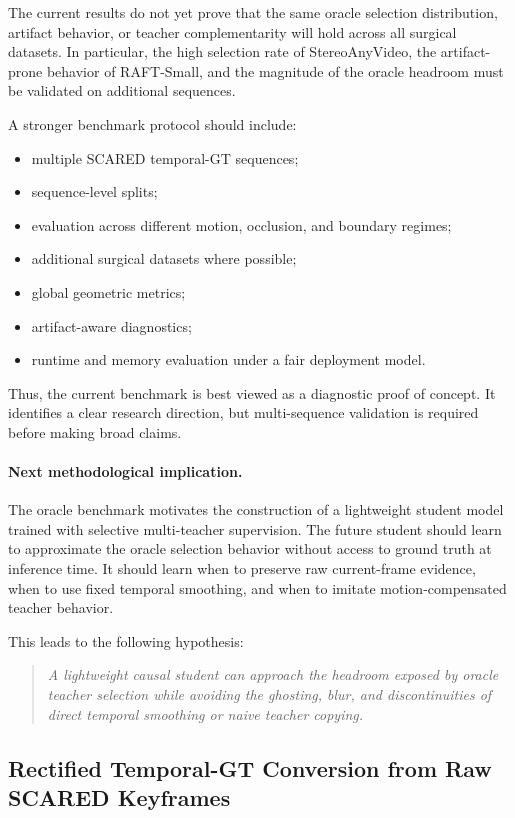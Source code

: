 \documentclass[11pt,a4paper]{article}
\begin{document}
The current results do not yet prove that the same oracle selection distribution, artifact behavior, or teacher complementarity will hold across all surgical datasets. In particular, the high selection rate of StereoAnyVideo, the artifact-prone behavior of RAFT-Small, and the magnitude of the oracle headroom must be validated on additional sequences.

A stronger benchmark protocol should include:
\begin{itemize}[leftmargin=*]
    \item multiple SCARED temporal-GT sequences;
    \item sequence-level splits;
    \item evaluation across different motion, occlusion, and boundary regimes;
    \item additional surgical datasets where possible;
    \item global geometric metrics;
    \item artifact-aware diagnostics;
    \item runtime and memory evaluation under a fair deployment model.
\end{itemize}

Thus, the current benchmark is best viewed as a diagnostic proof of concept. It identifies a clear research direction, but multi-sequence validation is required before making broad claims.

\paragraph{Next methodological implication.}
The oracle benchmark motivates the construction of a lightweight student model trained with selective multi-teacher supervision. The future student should learn to approximate the oracle selection behavior without access to ground truth at inference time. It should learn when to preserve raw current-frame evidence, when to use fixed temporal smoothing, and when to imitate motion-compensated teacher behavior.

This leads to the following hypothesis:
\begin{quote}
\emph{A lightweight causal student can approach the headroom exposed by oracle teacher selection while avoiding the ghosting, blur, and discontinuities of direct temporal smoothing or naive teacher copying.}
\end{quote}

\subsection{Rectified Temporal-GT Conversion from Raw SCARED Keyframes}
\label{sec:scared_rectified_temporal_gt}
\end{document}
